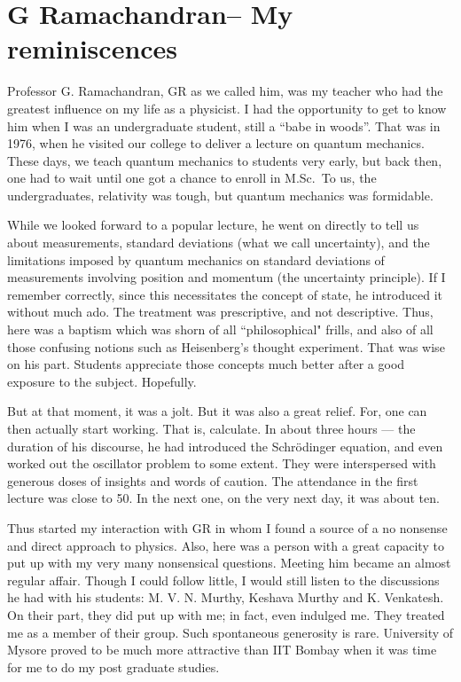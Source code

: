 \chapter[G Ramachandran -- My reminiscences]{G Ramachandran\break -- My reminiscences}\label{chap25}

\medskip

Professor G. Ramachandran, GR as we called him, was my teacher who had the greatest influence on my life as a physicist. I had the opportunity to get to know him when I was an undergraduate student, still a “babe in woods”. That was in 1976, when he visited our college to deliver a lecture on quantum mechanics. These days, we teach quantum mechanics to students very early, but back then, one had to wait until one got a chance to enroll in M.Sc.\ To us, the undergraduates, relativity was tough, but quantum mechanics was formidable.

While we looked forward to a popular lecture, he went on directly to tell us about measurements, standard deviations (what we call uncertainty), and the limitations imposed by quantum mechanics on standard deviations of measurements involving position and momentum (the uncertainty principle). If I remember correctly, since this necessitates the concept of state, he introduced it without much ado. The treatment was prescriptive, and not descriptive.  Thus, here was a baptism which was shorn of all ``philosophical" frills, and also of all those confusing notions such as Heisenberg's thought experiment. That was wise on his part. Students appreciate those concepts much better after a good exposure to the subject. Hopefully.

But at that moment, it was a jolt.  But it was also a great relief. For, one can then actually start working. That is, calculate. In about three hours --- the duration of his discourse, he had introduced the Schr\"{o}dinger equation, and even worked out the oscillator problem to some extent. They were interspersed with generous doses of insights and words of caution. The attendance in the first lecture was close to 50. In the next one, on the very next day, it was about ten.

Thus started my interaction with GR in whom I found a source of a no nonsense and direct approach to physics. Also, here was a person with a great capacity to put up with my very many nonsensical questions. Meeting him became an almost regular affair. Though I could follow little, I would still listen to the discussions he had with his students: M. V. N. Murthy, Keshava Murthy and K. Venkatesh. On their part, they did put up with me; in fact, even indulged me. They treated me as a member of their group. Such spontaneous generosity is rare. University of Mysore proved to be much more attractive than IIT Bombay when it was time for me to do my post graduate studies.

